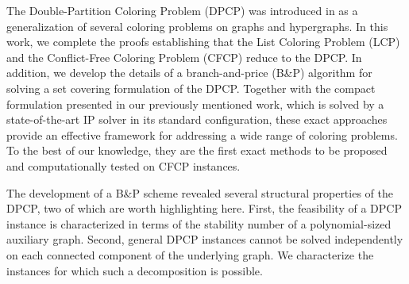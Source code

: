 \documentclass[preprint, 11pt, authoryear]{elsarticle}
\newcommand{\PP}{{\mathcal P}}
\newcommand{\QQ}{{\mathcal Q}}
\begin{document}
The Double-Partition Coloring Problem (DPCP) was introduced in \cite{LucciEtAl2025} as a generalization of several coloring problems on graphs and hypergraphs. In this work, we complete the proofs establishing that the List Coloring Problem (LCP) and the Conflict-Free Coloring Problem (CFCP) reduce to the DPCP. In addition, we develop the details of a branch-and-price (B\&P) algorithm for solving a set covering formulation of the DPCP. Together with the compact formulation presented in our previously mentioned work, which is solved by a state-of-the-art IP solver in its standard configuration, these exact approaches provide an effective framework for addressing a wide range of coloring problems. To the best of our knowledge, they are the first exact methods to be proposed and computationally tested on CFCP instances.

The development of a B\&P scheme revealed several structural properties of the DPCP, two of which are worth highlighting here. First, the feasibility of a DPCP instance is characterized in terms of the stability number of a polynomial-sized auxiliary graph. %
Second, general DPCP instances cannot be solved independently on each connected component of the underlying graph. We characterize the instances for which such a decomposition is possible.
\end{document}
